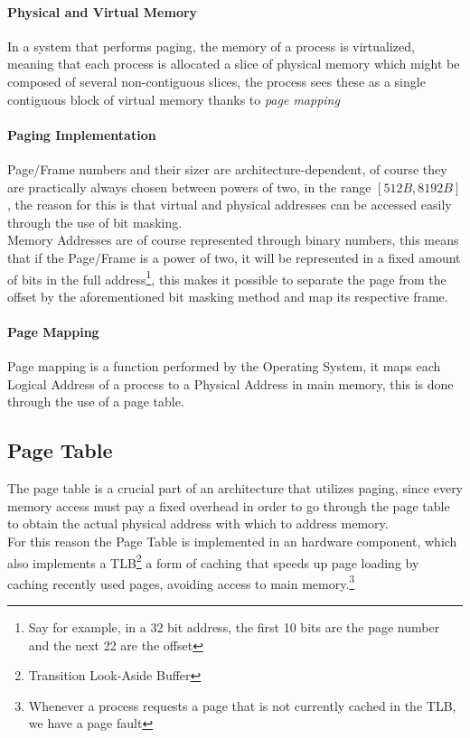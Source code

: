 \documentclass[openright, twoside]{report}
\theoremstyle{definition}
\theoremstyle{example}
\begin{document}
\paragraph{Physical and Virtual Memory}
In a system that performs paging, the memory of a process 
is virtualized, meaning that each process is allocated a 
slice of physical memory which might be composed of several 
non-contiguous slices, the process sees these as a single contiguous 
block of virtual memory thanks to \emph{page mapping}


\paragraph{Paging Implementation}
Page/Frame numbers and their sizer are architecture-dependent, of course 
they are practically always chosen between powers of two, in the range
$[512B, 8192B]$, the reason for this is that virtual and physical addresses 
can be accessed easily through the use of bit masking.\\ 

Memory Addresses are of course represented through binary numbers,
this means that if the Page/Frame is a power of two, it will be 
represented in a fixed amount of bits in the full address\footnote{Say for example, in a
32 bit address, the first 10 bits are the page number and the next 22 are the offset}, this 
makes it possible to separate the page from the offset by the aforementioned 
bit masking method and map its respective frame.

\paragraph{Page Mapping}
Page mapping is a function performed by the Operating System, 
it maps each Logical Address of a process to a Physical Address
in main memory, this is done through the use of a page table. 

\subsection{Page Table}
The page table is a crucial part of an architecture that utilizes 
paging, since every memory access must pay a fixed overhead in order 
to go through the page table to obtain the actual physical address with 
which to address memory.\\

For this reason the Page Table is implemented in an hardware component, which 
also implements a TLB\footnote{Transition Look-Aside Buffer}
a form of caching that speeds up page loading by caching recently used pages, 
avoiding access to main memory.\footnote{Whenever a process requests a page that is not currently cached in the TLB, we have 
a page fault}
\end{document}
